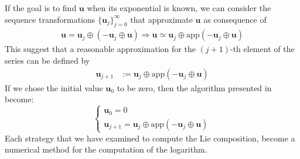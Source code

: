 If the goal is to find $\mathbf{u}$ when its exponential is known, we can consider the sequence transformations $\{\mathbf{u}_{j}  \}_{j=0}^{\infty}$ that approximate $\mathbf{u}$ as consequence of
\begin{align*}
\mathbf{u} = \mathbf{u}_{j} \oplus  (-\mathbf{u}_{j}  \oplus  \mathbf{u} ) \Longrightarrow
\mathbf{u} \simeq \mathbf{u}_{j} \oplus  \text{app}(-\mathbf{u}_{j}  \oplus  \mathbf{u} )
\end{align*}
This suggest that a reasonable approximation for the $(j+1)$-th element of the series can be defined by
\begin{align*}
\mathbf{u}_{j+1} & :=  \mathbf{u}_{j} \oplus  \text{app}(-\mathbf{u}_{j}  \oplus  \mathbf{u} )
\end{align*}
If we chose the initial value $\mathbf{u}_{0}$ to be zero, then the algorithm presented in \cite{Bossa:08}  become:
\begin{equation}\label{eq:bossa_reformulated}
\begin{cases}
\mathbf{u}_0 = 0 \\
\mathbf{u}_{j+1} = \mathbf{u}_{j} \oplus  \text{app}(-\mathbf{u}_{j}  \oplus  \mathbf{u} )
\end{cases}
\end{equation}
Each strategy that we have examined to compute the Lie composition, become a numerical method for the computation of the logarithm.
